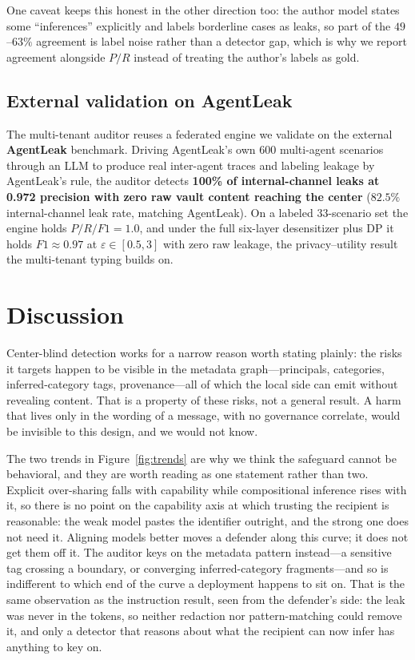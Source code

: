 \documentclass{article}
\begin{document}
One caveat keeps this honest in the other direction too: the author model states
some ``inferences'' explicitly and labels borderline cases as leaks, so part of the
$49$--$63\%$ agreement is label noise rather than a detector gap, which is why we
report agreement alongside $P/R$ instead of treating the author's labels as gold.


\subsection{External validation on AgentLeak}
The multi-tenant
auditor reuses a federated engine we validate on the external \textbf{AgentLeak}
benchmark. Driving AgentLeak's own 600 multi-agent scenarios through an LLM to
produce real inter-agent traces and labeling leakage by AgentLeak's rule, the
auditor detects \textbf{100\% of internal-channel leaks at 0.972 precision with
zero raw vault content reaching the center} ($82.5\%$ internal-channel leak rate,
matching AgentLeak). On a labeled 33-scenario set the engine holds $P/R/F1=1.0$,
and under the full six-layer desensitizer plus DP it holds $F1\approx0.97$ at
$\varepsilon\in[0.5,3]$ with zero raw leakage, the privacy--utility result the
multi-tenant typing builds on.



\section{Discussion}
Center-blind detection works for a narrow reason worth stating plainly: the risks
it targets happen to be visible in the metadata graph---principals, categories,
inferred-category tags, provenance---all of which the local side can emit without
revealing content. That is a property of these risks, not a general result. A
harm that lives only in the wording of a message, with no governance correlate,
would be invisible to this design, and we would not know.



The two trends in Figure~\ref{fig:trends} are why we think the safeguard cannot be
behavioral, and they are worth reading as one statement rather than two. Explicit
over-sharing falls with capability while compositional inference rises with it, so
there is no point on the capability axis at which trusting the recipient is
reasonable: the weak model pastes the identifier outright, and the strong one does
not need it. Aligning models better moves a defender along this curve; it does not
get them off it. The auditor keys on the metadata pattern instead---a sensitive tag
crossing a boundary, or converging inferred-category fragments---and so is
indifferent to which end of the curve a deployment happens to sit on. That is the
same observation as the instruction result, seen from the defender's side: the
leak was never in the tokens, so neither redaction nor pattern-matching could
remove it, and only a detector that reasons about what the recipient can now
infer has anything to key on.
\end{document}
